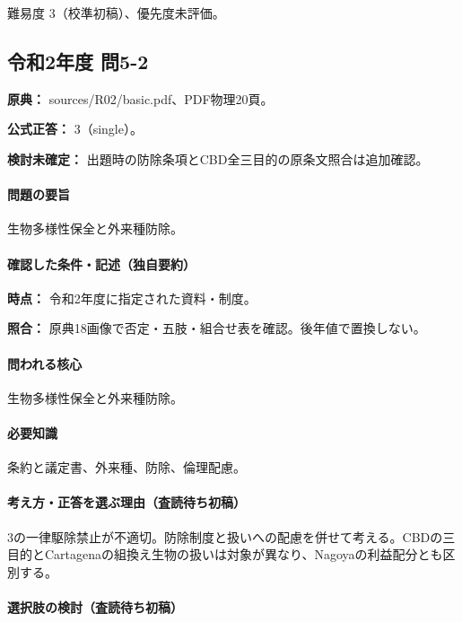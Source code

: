 \par 難易度 3（校準初稿）、優先度未評価。

\subsection{令和2年度 問5-2}
\label{q:r02-reg-basic-5-2}

\noindent\textbf{原典：} sources/R02/basic.pdf、PDF物理20頁。

\textbf{公式正答：} 3（single）。

\par\textbf{検討未確定：} 出題時の防除条項とCBD全三目的の原条文照合は追加確認。

\paragraph{問題の要旨} 生物多様性保全と外来種防除。

\paragraph{確認した条件・記述（独自要約）}\mbox{}\par

\noindent\textbf{時点：} 令和2年度に指定された資料・制度。\par

\noindent\textbf{照合：} 原典18画像で否定・五肢・組合せ表を確認。後年値で置換しない。\par

\paragraph{問われる核心} 生物多様性保全と外来種防除。

\paragraph{必要知識} 条約と議定書、外来種、防除、倫理配慮。

\paragraph{考え方・正答を選ぶ理由（査読待ち初稿）} 3の一律駆除禁止が不適切。防除制度と扱いへの配慮を併せて考える。CBDの三目的とCartagenaの組換え生物の扱いは対象が異なり、Nagoyaの利益配分とも区別する。

\paragraph{選択肢の検討（査読待ち初稿）}\mbox{}\par

